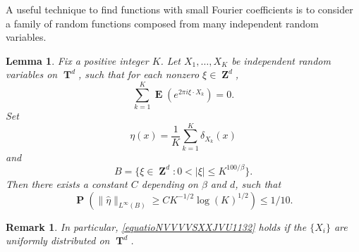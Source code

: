\documentclass[dvipsnames,letterpaper,12pt]{article}
\numberwithin{equation}{section}
\DeclareMathOperator{\ZZ}{\mathbf{Z}}
\DeclareMathOperator{\TT}{\mathbf{T}}
\newtheorem{lemma}[theorem]{Lemma}
\newtheorem{remark}[theorem]{Remark}
\numberwithin{theorem}{section}
\DeclareMathOperator{\EE}{\mathbf{E}}
\DeclareMathOperator{\PP}{\mathbf{P}}
\begin{document}
A useful technique to find functions with small Fourier coefficients is to consider a family of random functions composed from many independent random variables.

\begin{lemma} \label{LemmaGISCICS1}
    Fix a positive integer $K$. Let $X_1, \dots, X_K$ be independent random variables on $\TT^d$, such that for each nonzero $\xi \in \ZZ^d$,
    \begin{equation} \label{equatioNVVVVSXXJVU1132}
        \sum_{k = 1}^K \EE \left( e^{2 \pi i \xi \cdot X_k} \right) = 0.
    \end{equation}
    Set
    \[ \eta(x) = \frac{1}{K} \sum_{k = 1}^K \delta_{X_k}(x) \]
    and
    \[ B = \{ \xi \in \ZZ^d: 0 < |\xi| \leq K^{100/\beta} \}. \]
    Then there exists a constant $C$ depending on $\beta$ and $d$, such that%
    \[ \PP \left( \| \widehat{\eta} \|_{L^\infty(B)} \geq C K^{-1/2} \log(K)^{1/2} \right) \leq 1/10. \]
\end{lemma}

\begin{remark}
    In particular, \eqref{equatioNVVVVSXXJVU1132} holds if the $\{ X_i \}$ are uniformly distributed on $\TT^d$.
\end{remark}
\end{document}
